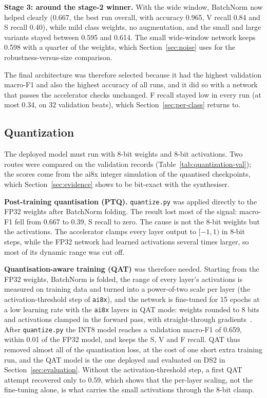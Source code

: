 \textbf{Stage 3: around the stage-2 winner.} With the wide window, BatchNorm now helped clearly (0.667, the best run overall, with accuracy 0.965, V recall 0.84 and S recall 0.40), while mild class weights, no augmentation, and the small and large variants stayed between 0.595 and 0.614. The small wide-window network keeps 0.598 with a quarter of the weights, which Section~\ref{sec:noise} uses for the robustness-versus-size comparison.

The final architecture was therefore selected because it had the highest validation macro-F1 and also the highest accuracy of all runs, and it did so with a network that passes the accelerator checks unchanged. F recall stayed low in every run (at most 0.34, on 32 validation beats), which Section~\ref{sec:per-class} returns to.

\subsection{Quantization}
\label{sec:quantization}

The deployed model must run with 8-bit weights and 8-bit activations. Two routes were compared on the validation records (Table~\ref{tab:quantization-val}); the scores come from the ai8x integer simulation of the quantised checkpoints, which Section~\ref{sec:evidence} shows to be bit-exact with the synthesiser.



\textbf{Post-training quantisation (PTQ).} \texttt{quantize.py} was applied directly to the FP32 weights after BatchNorm folding. The result lost most of the signal: macro-F1 fell from 0.667 to 0.39, S recall to zero. The cause is not the 8-bit weights but the activations. The accelerator clamps every layer output to $[-1, 1)$ in 8-bit steps, while the FP32 network had learned activations several times larger, so most of its dynamic range was cut off.

\textbf{Quantisation-aware training (QAT)} was therefore needed. Starting from the FP32 weights, BatchNorm is folded, the range of every layer's activations is measured on training data and turned into a power-of-two scale per layer (the activation-threshold step of \texttt{ai8x}), and the network is fine-tuned for 15 epochs at a low learning rate with the \texttt{ai8x} layers in QAT mode: weights rounded to 8 bits and activations clamped in the forward pass, with straight-through gradients~\cite{jacob2018quantization}. After \texttt{quantize.py} the INT8 model reaches a validation macro-F1 of 0.659, within 0.01 of the FP32 model, and keeps the S, V and F recall. QAT thus removed almost all of the quantisation loss, at the cost of one short extra training run, and the QAT model is the one deployed and evaluated on DS2 in Section~\ref{sec:evaluation}. Without the activation-threshold step, a first QAT attempt recovered only to 0.59, which shows that the per-layer scaling, not the fine-tuning alone, is what carries the small activations through the 8-bit clamp.
